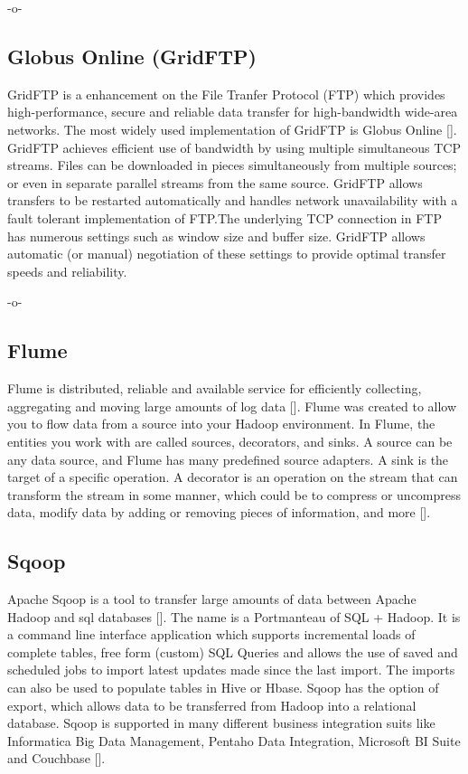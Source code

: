      -o-

\subsection{Globus Online (GridFTP)}

GridFTP is a enhancement on the File Tranfer Protocol (FTP) which
provides high-performance, secure and reliable data transfer for
high-bandwidth wide-area networks. The most widely used implementation
of GridFTP is Globus Online [\cite{www-GlobusOnline}]. GridFTP achieves
efficient use of bandwidth by using multiple simultaneous TCP streams.
Files can be downloaded in pieces simultaneously from multiple
sources; or even in separate parallel streams from the same
source. GridFTP allows transfers to be restarted automatically and
handles network unavailability with a fault tolerant implementation of
FTP.The underlying TCP connection in FTP has numerous settings such as
window size and buffer size. GridFTP allows automatic (or manual)
negotiation of these settings to provide optimal transfer speeds and
reliability.

     -o-


\subsection{Flume}

Flume is distributed, reliable and available service for efficiently
collecting, aggregating and moving large amounts of log
data [\cite{apache-flume}]. Flume was created to allow you to flow data
from a source into your Hadoop environment.  In Flume, the entities
you work with are called sources, decorators, and sinks. A source can
be any data source, and Flume has many predefined source adapters. A
sink is the target of a specific operation. A decorator is an
operation on the stream that can transform the stream in some manner,
which could be to compress or uncompress data, modify data by adding
or removing pieces of information, and more [\cite{ibm-flume}].

\subsection{Sqoop}
     
Apache Sqoop is a tool to transfer large amounts of data between
Apache Hadoop and sql databases [\cite{www-sqoop}]. The name is a
Portmanteau of SQL + Hadoop. It is a command line interface
application which supports incremental loads of complete tables, free
form (custom) SQL Queries and allows the use of saved and scheduled
jobs to import latest updates made since the last import. The imports
can also be used to populate tables in Hive or Hbase. Sqoop has the
option of export, which allows data to be transferred from Hadoop into
a relational database. Sqoop is supported in many different business
integration suits like Informatica Big Data Management, Pentaho Data
Integration, Microsoft BI Suite and Couchbase [\cite{sqoop-wiki}].

